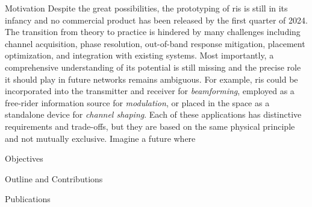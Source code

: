 \begin{section}{Motivation}
	Despite the great possibilities, the prototyping of \gls{ris} is still in its infancy and no commercial product has been released by the first quarter of 2024.
	The transition from theory to practice is hindered by many challenges including channel acquisition, phase resolution, out-of-band response mitigation, placement optimization, and integration with existing systems.
	Most importantly, a comprehensive understanding of its potential is still missing and the precise role it should play in future networks remains ambiguous.
	For example, \gls{ris} could be incorporated into the transmitter and receiver for \emph{beamforming}, employed as a free-rider information source for \emph{modulation}, or placed in the space as a standalone device for \emph{channel shaping}.
	Each of these applications has distinctive requirements and trade-offs, but they are based on the same physical principle and not mutually exclusive.
	Imagine a future where 
\end{section}

\begin{section}{Objectives}

\end{section}

\begin{section}{Outline and Contributions}

\end{section}

\begin{section}{Publications}
\end{section}
